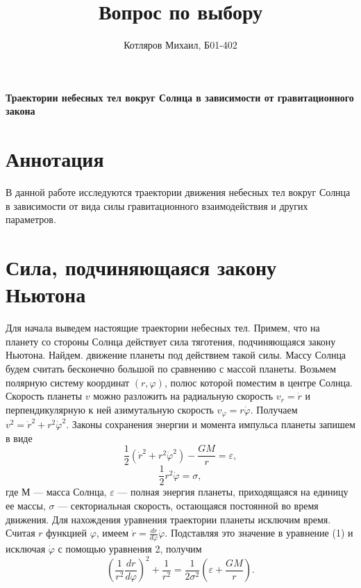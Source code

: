 \documentclass[a4paper]{article}
\title{\textbf{Вопрос по выбору}}
\date{}
\author{Котляров Михаил, Б01-402}
\begin{document}
\maketitle
\begin{center}\textbf{ Траектории небесных тел вокруг Солнца в зависимости от гравитационного закона}\end{center}

\section*{Аннотация}
В данной работе исследуются траектории движения небесных тел вокруг Солнца в зависимости от вида силы гравитационного взаимодействия и других параметров.

\section{Сила, подчиняющаяся закону Ньютона}
Для начала выведем настоящие траектории небесных тел. Примем, что на планету со стороны Солнца действует сила тяготения, подчиняющаяся закону Ньютона. Найдем. движение планеты под действием такой силы. Массу Солнца будем считать бесконечно большой по сравнению с массой планеты. Возьмем полярную систему координат $(r, \varphi)$,
полюс которой поместим в центре Солнца. Скорость планеты $v$ можно разложить на радиальную скорость $v_r = \dot{r}$ и перпендикулярную к ней азимутальную скорость $v_\varphi = r  \dot{\varphi}$. Получаем $v^2 = {\dot{r}}^2 +r^2  {\dot{\varphi}}^2$. Законы сохранения энергии и момента
импульса планеты запишем в виде
\begin{equation} \tag{1}
\frac{1} {2} ({\dot{r}}^2 +r^2  {\dot{\varphi}}^2) - \frac{GM}{r} = \varepsilon,
\end{equation}
\begin{equation} \tag{2}
\frac{1} {2} r^2 \dot{\varphi} = \sigma,
\end{equation}
где М — масса Солнца, $\varepsilon$ — полная энергия планеты, приходящаяся на единицу ее массы, $\sigma$ — секториальная скорость, остающаяся постоянной во время движения. Для нахождения уравнения траектории планеты исключим время. Считая $r$ функцией $\varphi$, имеем $ \dot{r} = \frac{dr}{d\varphi}\dot{\varphi}$. Подставляя это значение в уравнение (1) и исключая $\dot{\varphi}$ с помощью уравнения 2, получим
\begin{equation} \tag{3}
(\frac{1}{r^2}\frac{dr}{d\varphi})^2 + \frac{1}{r^2} = \frac{1}{2\sigma^2}(\varepsilon + \frac{GM}{r}).
\end{equation}
\end{document}
